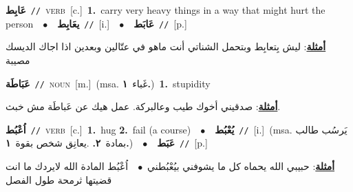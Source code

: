 \documentclass[10pt,a4paper,twoside]{article} %
\begin{document}
\begin{multicols}{2}
{{{{{{{{\setlength\topsep{0pt}\textbf{\foreignlanguage{arabic}{عَابِط}}\ {\color{gray}\texttt{//}\color{black}}\ \textsc{verb}\ [c.]\ \textbf{1.}~carry very heavy things in a way that might hurt the person\ \ $\bullet$\ \ \setlength\topsep{0pt}\textbf{\foreignlanguage{arabic}{يعَابِط}}\ {\color{gray}\texttt{//}\color{black}}\ [i.]\ \ $\bullet$\ \ \setlength\topsep{0pt}\textbf{\foreignlanguage{arabic}{عَابَط}}\ {\color{gray}\texttt{//}\color{black}}\ [p.]\  \begin{flushright}\color{gray}\foreignlanguage{arabic}{\textbf{\underline{\foreignlanguage{arabic}{أمثلة}}}: ليش بِتعابِط وبتحمل الشناتي أنت ماهو في عتّالين وبعدين اذا اجاك الديسك مصيبة}\end{flushright}\color{black}} \vspace{2mm}

{\setlength\topsep{0pt}\textbf{\foreignlanguage{arabic}{عَبَاطَة}}\ {\color{gray}\texttt{//}\color{black}}\ \textsc{noun}\ [m.]\ \color{gray}(msa. \foreignlanguage{arabic}{غَباء}~\foreignlanguage{arabic}{\textbf{١.}})\color{black}\ \textbf{1.}~stupidity\  \begin{flushright}\color{gray}\foreignlanguage{arabic}{\textbf{\underline{\foreignlanguage{arabic}{أمثلة}}}: صدقيني أخوك طيب وعالبركة. عمل هيك عن عَباطَة مش خبث.}\end{flushright}\color{black}} \vspace{2mm}

{\setlength\topsep{0pt}\textbf{\foreignlanguage{arabic}{اُعْبُط}}\ {\color{gray}\texttt{//}\color{black}}\ \textsc{verb}\ [c.]\ \textbf{1.}~hug  \textbf{2.}~fail (a course)\ \ $\bullet$\ \ \setlength\topsep{0pt}\textbf{\foreignlanguage{arabic}{يُعْبُط}}\ {\color{gray}\texttt{//}\color{black}}\ [i.]\ \color{gray}(msa. \foreignlanguage{arabic}{يَرسُب طالب بمادة}~\foreignlanguage{arabic}{\textbf{٢.}}  .\foreignlanguage{arabic}{يعانِق شخص بقوة}~\foreignlanguage{arabic}{\textbf{١.}})\color{black}\ \ $\bullet$\ \ \setlength\topsep{0pt}\textbf{\foreignlanguage{arabic}{عَبَط}}\ {\color{gray}\texttt{//}\color{black}}\ [p.]\  \begin{flushright}\color{gray}\foreignlanguage{arabic}{\textbf{\underline{\foreignlanguage{arabic}{أمثلة}}}: حبيبي الله يحماه كل ما يشوفني بيُعْبُطني\ $\bullet$\ \  اُعْبُط المادة الله لايردك ما انت قضيتها ثرمحة طول الفصل}\end{flushright}\color{black}} \vspace{2mm}

}}}}}}}
\end{multicols}
\end{document}
